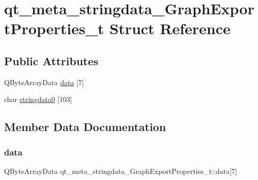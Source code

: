 \hypertarget{structqt__meta__stringdata___graph_export_properties__t}{}\section{qt\+\_\+meta\+\_\+stringdata\+\_\+\+Graph\+Export\+Properties\+\_\+t Struct Reference}
\label{structqt__meta__stringdata___graph_export_properties__t}
\subsection*{Public Attributes}
\begin{DoxyCompactItemize}
\item 
Q\+Byte\+Array\+Data \mbox{\hyperlink{structqt__meta__stringdata___graph_export_properties__t_ab36ac832bb70f558d40c1a5449e18bb2}{data}} \mbox{[}7\mbox{]}
\item 
char \mbox{\hyperlink{structqt__meta__stringdata___graph_export_properties__t_a3ed78a6d00a982d41ae95004a7e5553b}{stringdata0}} \mbox{[}103\mbox{]}
\end{DoxyCompactItemize}


\subsection{Member Data Documentation}
\mbox{\label{structqt__meta__stringdata___graph_export_properties__t_ab36ac832bb70f558d40c1a5449e18bb2}} 
\subsubsection{\texorpdfstring{data}{data}}
{\footnotesize\ttfamily Q\+Byte\+Array\+Data qt\+\_\+meta\+\_\+stringdata\+\_\+\+Graph\+Export\+Properties\+\_\+t\+::data\mbox{[}7\mbox{]}}

\mbox{\label{structqt__meta__stringdata___graph_export_properties__t_a3ed78a6d00a982d41ae95004a7e5553b}} 
